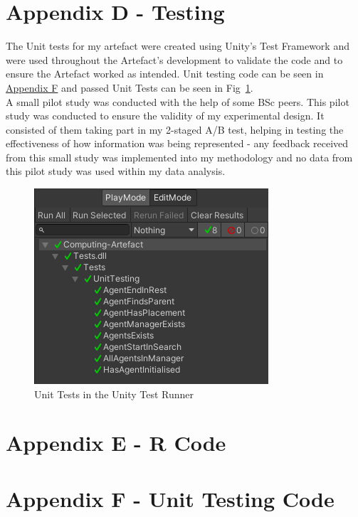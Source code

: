 \newpage
\section*{Appendix D - Testing} \label{append:d}
The Unit tests for my artefact were created using Unity's Test Framework and were used throughout the Artefact's development to validate the code and to ensure the Artefact worked as intended. Unit testing code can be seen in \hyperref[append:f]{Appendix F} and passed Unit Tests can be seen in Fig~\ref{unit-tests}.
\\
A small pilot study was conducted with the help of some BSc peers. This pilot study was conducted to ensure the validity of my experimental design. It consisted of them taking part in my 2-staged A/B test, helping in testing the effectiveness of how information was being represented - any feedback received from this small study was implemented into my methodology and no data from this pilot study was used within my data analysis.

\begin{figure}[ht]
    \includegraphics[width=\columnwidth]{./Images/unit-tests.png}
    \centering
    \caption{Unit Tests in the Unity Test Runner}
    \label{unit-tests}
\end{figure}

\newpage
\newpage
\section*{Appendix E - R Code} \label{append:e}




\newpage
\section*{Appendix F - Unit Testing Code} \label{append:f}
